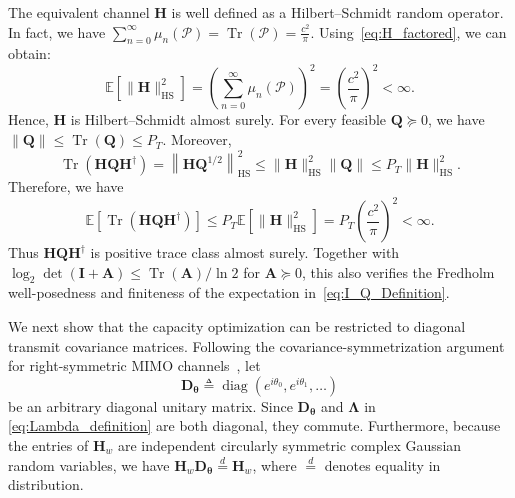 \documentclass[lettersize,journal]{IEEEtran}
\theoremstyle{plain}
\begin{document}
The equivalent channel $\mathbf{H}$ is well defined as a Hilbert--Schmidt random operator. In fact, we have $\sum_{n=0}^{\infty}\mu_n(\mathcal{P})
=
\operatorname{Tr}(\mathcal{P})
=
\frac{c^2}{\pi}$.
Using~\eqref{eq:H_factored}, we can obtain:
$$
	\mathbb{E}\left[\|\mathbf{H}\|_{\mathrm{HS}}^2\right]
	=
	\left(\sum_{n=0}^{\infty}\mu_n(\mathcal{P})\right)^2
	=
	\left(\frac{c^2}{\pi}\right)^2
	<\infty.
	\label{eq:H_HS}
$$
Hence, $\mathbf{H}$ is Hilbert--Schmidt almost surely. For every feasible $\mathbf{Q}\succeq0$, we have
$\|\mathbf{Q}\|\leq\operatorname{Tr}(\mathbf{Q})\leq P_T$. Moreover,
$$
	\operatorname{Tr}
	\left(
	\mathbf{H}\mathbf{Q}\mathbf{H}^{\dagger}
	\right)
	=
	\left\|
	\mathbf{H}\mathbf{Q}^{1/2}
	\right\|_{\mathrm{HS}}^2
	\leq
	\|\mathbf{H}\|_{\mathrm{HS}}^2
	\|\mathbf{Q}\|
	\leq
	P_T\|\mathbf{H}\|_{\mathrm{HS}}^2.
	\label{eq:HQH_trace_bound}
$$
Therefore, we have
$$
	\mathbb{E}
	\left[
	\operatorname{Tr}
	\left(
	\mathbf{H}\mathbf{Q}\mathbf{H}^{\dagger}
	\right)
	\right]
	\leq
	P_T
	\mathbb{E}
	\left[
	\|\mathbf{H}\|_{\mathrm{HS}}^2
	\right]
	=
	P_T
	\left(
	\frac{c^2}{\pi}
	\right)^2
	<\infty.
	\label{eq:HQH_expectation_bound}
$$
Thus $\mathbf{H}\mathbf{Q}\mathbf{H}^{\dagger}$ is positive trace
class almost surely. Together with
$\log_2\det(\mathbf{I}+\mathbf{A})\leq
\operatorname{Tr}(\mathbf{A})/\ln2$ for $\mathbf{A}\succeq0$, this
also verifies the Fredholm well-posedness and finiteness of the
expectation in~\eqref{eq:I_Q_Definition}.

We next show that the capacity optimization can be restricted to
diagonal transmit covariance matrices. Following the
covariance-symmetrization argument for right-symmetric MIMO
channels~\cite[Theorem~4.2]{RheeTaricco2006}, let
$$
	\mathbf{D}_{\boldsymbol{\theta}}
	\triangleq
	\operatorname{diag}
	\left(e^{i\theta_0},e^{i\theta_1},\ldots\right)
$$
be an arbitrary diagonal unitary matrix. Since
$\mathbf{D}_{\boldsymbol{\theta}}$ and $\boldsymbol{\Lambda}$ in \eqref{eq:Lambda_definition} are
both diagonal, they commute. Furthermore, because the entries of
$\mathbf{H}_w$ are independent circularly symmetric complex Gaussian
random variables, we have $\mathbf{H}_w\mathbf{D}_{\boldsymbol{\theta}}
	\overset{d}{=}
	\mathbf{H}_w$,
where $\overset{d}{=}$ denotes equality in distribution.
\end{document}
